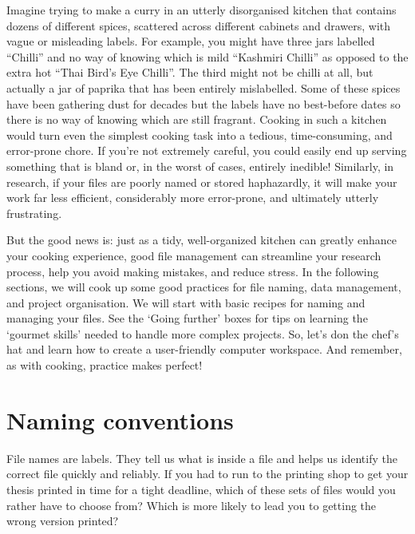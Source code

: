\documentclass[
  letterpaper,
  DIV=11,
  numbers=noendperiod]{scrreprt}
\begin{document}
Imagine trying to make a curry in an utterly disorganised kitchen that
contains dozens of different spices, scattered across different cabinets
and drawers, with vague or misleading labels. For example, you might
have three jars labelled ``Chilli'' and no way of knowing which is mild
``Kashmiri Chilli'' as opposed to the extra hot ``Thai Bird's Eye
Chilli''. The third might not be chilli at all, but actually a jar of
paprika that has been entirely mislabelled. Some of these spices have
been gathering dust for decades but the labels have no best-before dates
so there is no way of knowing which are still fragrant. Cooking in such
a kitchen would turn even the simplest cooking task into a tedious,
time-consuming, and error-prone chore. If you're not extremely careful,
you could easily end up serving something that is bland or, in the worst
of cases, entirely inedible! Similarly, in research, if your files are
poorly named or stored haphazardly, it will make your work far less
efficient, considerably more error-prone, and ultimately utterly
frustrating.

But the good news is: just as a tidy, well-organized kitchen can greatly
enhance your cooking experience, good file management can streamline
your research process, help you avoid making mistakes, and reduce
stress. In the following sections, we will cook up some good practices
for file naming, data management, and project organisation. We will
start with basic recipes for naming and managing your files. See the
`Going further' boxes for tips on learning the `gourmet skills' needed
to handle more complex projects. So, let's don the chef's hat and learn
how to create a user-friendly computer workspace. And remember, as with
cooking, practice makes perfect! 🧑🏽‍🍳

\section{Naming conventions}\label{naming-conventions}

File names are labels. They tell us what is inside a file and helps us
identify the correct file quickly and reliably. If you had to run to the
printing shop to get your thesis printed in time for a tight deadline,
which of these sets of files would you rather have to choose from? Which
is more likely to lead you to getting the wrong version printed?
\end{document}
